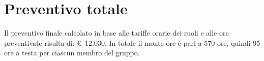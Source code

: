 \section{Preventivo totale}

Il preventivo finale calcolato in base alle tariffe orarie dei ruoli e alle ore preventivate risulta di: \euro~12.030.
In totale il monte ore è pari a 570 ore, quindi 95 ore a testa per ciascun membro del gruppo.
